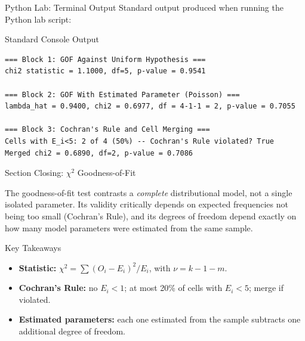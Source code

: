 \documentclass[10pt, aspectratio=169]{beamer}
\begin{document}
\begin{frame}[fragile]{Python Lab: Terminal Output}
  \scriptsize
  Standard output produced when running the Python lab script:
  \vspace{0.02cm}
  \begin{block}{Standard Console Output}
    \fontsize{4pt}{5pt}\selectfont
    \begin{verbatim}
=== Block 1: GOF Against Uniform Hypothesis ===
chi2 statistic = 1.1000, df=5, p-value = 0.9541

=== Block 2: GOF With Estimated Parameter (Poisson) ===
lambda_hat = 0.9400, chi2 = 0.6977, df = 4-1-1 = 2, p-value = 0.7055

=== Block 3: Cochran's Rule and Cell Merging ===
Cells with E_i<5: 2 of 4 (50%) -- Cochran's Rule violated? True
Merged chi2 = 0.6890, df=2, p-value = 0.7086
    \end{verbatim}
  \end{block}
\end{frame}


\begin{frame}{Section Closing: $\chi^2$ Goodness-of-Fit}
  \begin{reflexion}
    The goodness-of-fit test contrasts a \emph{complete} distributional model, not a single isolated parameter. Its validity critically depends on expected frequencies not being too small (Cochran's Rule), and its degrees of freedom depend exactly on how many model parameters were estimated from the same sample.
  \end{reflexion}

  \vspace{0.2cm}
  \pause
  \begin{block}{Key Takeaways}
    \begin{itemize}\itemsep=0.08cm
      \item \textbf{Statistic:} $\chi^2=\sum(O_i-E_i)^2/E_i$, with $\nu=k-1-m$.
      \item \textbf{Cochran's Rule:} no $E_i<1$; at most 20\% of cells with $E_i<5$; merge if violated.
      \item \textbf{Estimated parameters:} each one estimated from the sample subtracts one additional degree of freedom.
    \end{itemize}
  \end{block}
\end{frame}
\end{document}
